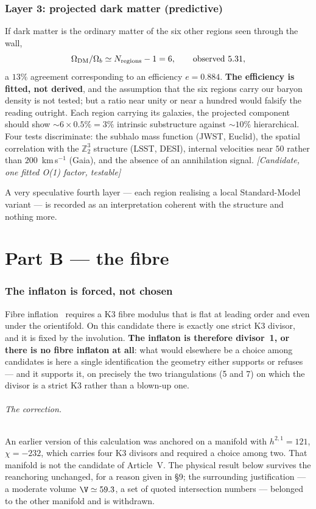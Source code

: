 \section{Layer 3: projected dark matter (predictive)}
If dark matter is the ordinary matter of the six other regions seen through the wall,
\begin{equation}
\Omega_{\rm DM}/\Omega_b\simeq N_{\rm regions}-1=6,\qquad\text{observed }5.31,
\end{equation}
a $13\%$ agreement corresponding to an efficiency $e=0.884$. \textbf{The efficiency is fitted, not derived}, and the assumption that the six regions carry our baryon density is not tested; but a ratio near unity or near a hundred would falsify the reading outright. Each region carrying its galaxies, the projected component should show $\sim6\times0.5\%=3\%$ intrinsic substructure against $\sim10\%$ hierarchical. Four tests discriminate: the subhalo mass function (JWST, Euclid), the spatial correlation with the $\mathbb Z_2^3$ structure (LSST, DESI), internal velocities near $50$ rather than $200$~km\,s$^{-1}$ (Gaia), and the absence of an annihilation signal. \textit{[Candidate, one fitted O(1) factor, testable]}

A very speculative fourth layer --- each region realising a local Standard-Model variant --- is recorded as an interpretation coherent with the structure and nothing more.

\part*{Part B --- the fibre}
\section{The inflaton is forced, not chosen}
Fibre inflation~\cite{CBQ} requires a K3 fibre modulus that is flat at leading order and even under the orientifold. On this candidate there is exactly one strict K3 divisor, and it is fixed by the involution. \textbf{The inflaton is therefore divisor~1, or there is no fibre inflaton at all}: what would elsewhere be a choice among candidates is here a single identification the geometry either supports or refuses --- and it supports it, on precisely the two triangulations (5 and 7) on which the divisor is a strict K3 rather than a blown-up one.

\paragraph{The correction.} An earlier version of this calculation was anchored on a manifold with $h^{2,1}=121$, $\chi=-232$, which carries four K3 divisors and required a choice among two. That manifold is not the candidate of Article~V. The physical result below survives the reanchoring unchanged, for a reason given in \S9; the surrounding justification --- a moderate volume $\V\simeq59.3$, a set of quoted intersection numbers --- belonged to the other manifold and is withdrawn.

